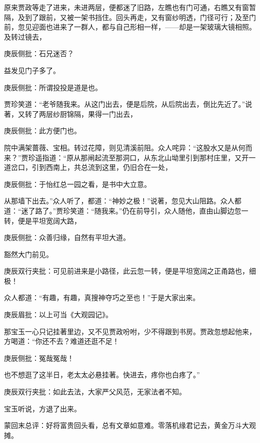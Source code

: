 \begin{parag}
    原来贾政等走了进来，未进两层，便都迷了旧路，左瞧也有门可通，右瞧又有窗暂隔，及到了跟前，又被一架书挡住。回头再走，又有窗纱明透，门径可行；及至门前，忽见迎面也进来了一群人，都与自己形相一样，——却是一架玻璃大镜相照。及转过镜去，\begin{note}庚辰侧批：石兄迷否？\end{note}益发见门子多了。\begin{note}庚辰侧批：所谓投投是道是也。\end{note}贾珍笑道：“老爷随我来。从这门出去，便是后院，从后院出去，倒比先近了。”说著，又转了两层纱厨锦隔，果得一门出去，\begin{note}庚辰侧批：此方便门也。\end{note}院中满架蔷薇、宝相。转过花障，则见清溪前阻。众人咤异：“这股水又是从何而来？”贾珍遥指道：“原从那闸起流至那洞口，从东北山坳里引到那村庄里，又开一道岔口，引到西南上，共总流到这里，仍旧合在一处，\begin{note}庚辰侧批：于怡红总一园之看，是书中大立意。\end{note}从那墙下出去。”众人听了，都道：“神妙之极！”说著，忽见大山阻路。众人都道：“迷了路了。”贾珍笑道：“随我来。”仍在前导引，众人随他，直由山脚边忽一转，便是平坦宽阔大路，\begin{note}庚辰侧批：众善归缘，自然有平坦大道。\end{note}豁然大门前见。\begin{note}庚辰双行夹批：可见前进来是小路径，此云忽一转，便是平坦宽阔之正甬路也，细极！\end{note}众人都道：“有趣，有趣，真搜神夺巧之至也！”于是大家出来。\begin{note}庚辰眉批：以上可当《大观园记》。\end{note}那宝玉一心只记挂著里边，又不见贾政吩咐，少不得跟到书房。贾政忽想起他来，方喝道：“你还不去？难道还逛不足！\begin{note}庚辰侧批：冤哉冤哉！\end{note}也不想逛了这半日，老太太必悬挂著。快进去，疼你也白疼了。”\begin{note}庚辰双行夹批：如此去法，大家严父风范，无家法者不知。\end{note}宝玉听说，方退了出来。
\end{parag}


\begin{parag}
    \begin{note}蒙回末总评：好将富贵回头看，总有文章如意难。零落机缘君记去，黄金万斗大观摊。\end{note}
\end{parag}


